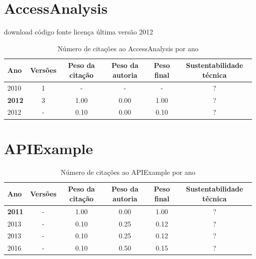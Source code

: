 \section{AccessAnalysis}
\checkmark download
\checkmark código fonte
\checkmark licença
\checkmark última versão 2012



\begin{table}[H]
\caption{Número de citações ao AccessAnalysis por ano}
\centering
\begin{tabular}{| l | c | c | c | c | c |}
  \hline
  Ano & Versões & Peso da citação & Peso da autoria & Peso final & Sustentabilidade técnica \\
  \hline
        2010 & 1 & - & - & - & ? \\
\hline
            {\bf 2012}
          &
          3
          &
          1.00
          &
          0.00
          &
            {\color{blue} 1.00}
          &
          ?
          \\
            2012
          &
          -
          &
          0.10
          &
          0.00
          &
            {\color{red} 0.10}
          &
          ?
          \\
\hline
\end{tabular}
\end{table}



\section{APIExample}



\begin{table}[H]
\caption{Número de citações ao APIExample por ano}
\centering
\begin{tabular}{| l | c | c | c | c | c |}
  \hline
  Ano & Versões & Peso da citação & Peso da autoria & Peso final & Sustentabilidade técnica \\
  \hline
            {\bf 2011}
          &
          -
          &
          1.00
          &
          0.00
          &
            {\color{blue} 1.00}
          &
          ?
          \\
\hline
            2013
          &
          -
          &
          0.10
          &
          0.25
          &
            {\color{red} 0.12}
          &
          ?
          \\
            2013
          &
          -
          &
          0.10
          &
          0.25
          &
            {\color{red} 0.12}
          &
          ?
          \\
\hline
            2016
          &
          -
          &
          0.10
          &
          0.50
          &
            {\color{red} 0.15}
          &
          ?
          \\
\hline
\end{tabular}
\end{table}



